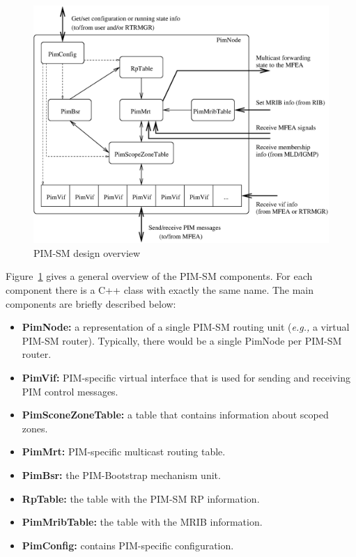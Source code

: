 \documentclass[11pt]{article}
\newcommand{\eg}{\emph{e.g.,}\xspace}
\begin{document}
\begin{figure}[htbp]
  \begin{center}
    \includegraphics[width=6.0in]{figs/pim_design_overview}
    \caption{PIM-SM design overview}
    \label{fig:pim_design_overview}
  \end{center}
\end{figure}

Figure~\ref{fig:pim_design_overview} gives a general overview of the
PIM-SM components. For each component there is a C++ class with exactly
the same name. The main components are briefly described below:

\begin{itemize}

  \item {\bf PimNode:} a representation of a single PIM-SM routing unit
  (\eg a virtual PIM-SM router).
  Typically, there would be a single PimNode per PIM-SM router.

  \item {\bf PimVif:} PIM-specific virtual interface that is used for
  sending and receiving PIM control messages.

  \item {\bf PimSconeZoneTable:} a table that contains information about
  scoped zones.

  \item {\bf PimMrt:} PIM-specific multicast routing table.

  \item {\bf PimBsr:} the PIM-Bootstrap mechanism unit.

  \item {\bf RpTable:} the table with the PIM-SM RP information.

  \item {\bf PimMribTable:} the table with the MRIB information.

  \item {\bf PimConfig:} contains PIM-specific configuration.

\end{itemize}
\end{document}

